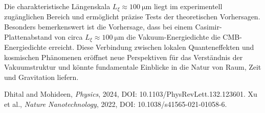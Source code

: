\documentclass[12pt,a4paper]{article}
\begin{document}
	Die charakteristische Längenskala \( L_\xi \approx \SI{100}{\micro\meter} \) liegt im experimentell zugänglichen Bereich und ermöglicht präzise Tests der theoretischen Vorhersagen. Besonders bemerkenswert ist die Vorhersage, dass bei einem Casimir-Plattenabstand von circa \( L_\xi \approx \SI{100}{\micro\meter} \) die Vakuum-Energiedichte die CMB-Energiedichte erreicht. Diese Verbindung zwischen lokalen Quanteneffekten und kosmischen Phänomenen eröffnet neue Perspektiven für das Verständnis der Vakuumstruktur und könnte fundamentale Einblicke in die Natur von Raum, Zeit und Gravitation liefern.
	
	\begin{thebibliography}{9}
		Dhital and Mohideen, \emph{Physics}, 2024, DOI: 10.1103/PhysRevLett.132.123601.
		Xu et al., \emph{Nature Nanotechnology}, 2022, DOI: 10.1038/s41565-021-01058-6.
	\end{thebibliography}
	
\end{document}
